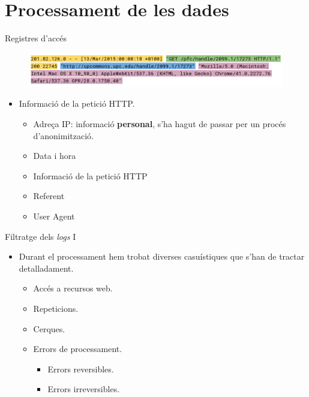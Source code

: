 \section{Processament de les dades}\label{sec:data-processing}

\begin{frame}{Registres d'accés}

\begin{figure}
    \includegraphics[width=\textwidth]{figures/example-log}
    \label{fig:log-example}
\end{figure}

\begin{itemize}%
    \item Informació de la petició HTTP.
    \begin{itemize}%
        \item Adreça IP: informació \textbf{personal}, s'ha hagut de passar per un procés d'anonimització.
        \item Data i hora
        \item Informació de la petició HTTP
        \item Referent
        \item User Agent
    \end{itemize}
\end{itemize}

\end{frame}

\begin{frame}{Filtratge dels \textit{logs} I}
    \begin{itemize}%
        \item Durant el processament hem trobat diverses casuístiques que s'han de tractar detalladament.
        \begin{itemize}%
            \item Accés a recursos web.
            \item Repeticions.
            \item Cerques.
            \item Errors de processament.
            \begin{itemize}%
                \item Errors reversibles.
                \item Errors irreversibles.
            \end{itemize}
        \end{itemize}
    \end{itemize}
\end{frame}

